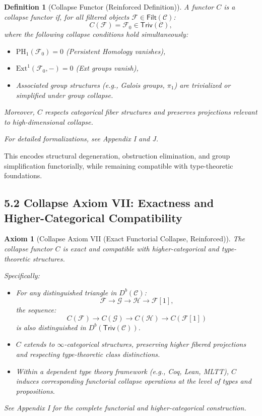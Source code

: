 \documentclass[11pt]{article}
\newtheorem{definition}[theorem]{Definition}
\newtheorem{axiom}{Axiom}[section]
\begin{document}
\begin{definition}[Collapse Functor (Reinforced Definition)]
A functor \( C \) is a collapse functor if, for all filtered objects \( \mathcal{F} \in \mathsf{Filt}(\mathcal{C}) \):
\[
C(\mathcal{F}) = \mathcal{F}_0 \in \mathsf{Triv}(\mathcal{C}),
\]
where the following collapse conditions hold simultaneously:
\begin{itemize}
    \item \(\mathrm{PH}_1(\mathcal{F}_0) = 0\) \quad (Persistent Homology vanishes),
    \item \(\mathrm{Ext}^1(\mathcal{F}_0, -) = 0\) \quad (Ext groups vanish),
    \item Associated group structures (e.g., Galois groups, \(\pi_1\)) are trivialized or simplified under group collapse.
\end{itemize}
Moreover, \( C \) respects categorical fiber structures and preserves projections relevant to high-dimensional collapse.

For detailed formalizations, see Appendix I and J.
\end{definition}

This encodes structural degeneration, obstruction elimination, and group simplification functorially, while remaining compatible with type-theoretic foundations.

\subsection*{5.2 Collapse Axiom VII: Exactness and Higher-Categorical Compatibility}

\begin{axiom}[Collapse Axiom VII (Exact Functorial Collapse, Reinforced)]
The collapse functor \( C \) is exact and compatible with higher-categorical and type-theoretic structures.

Specifically:
\begin{itemize}
    \item For any distinguished triangle in \( D^b(\mathcal{C}) \):
    \[
    \mathcal{F} \to \mathcal{G} \to \mathcal{H} \to \mathcal{F}[1],
    \]
    the sequence:
    \[
    C(\mathcal{F}) \to C(\mathcal{G}) \to C(\mathcal{H}) \to C(\mathcal{F}[1])
    \]
    is also distinguished in \( D^b(\mathsf{Triv}(\mathcal{C})) \).
    
    \item \( C \) extends to \(\infty\)-categorical structures, preserving higher fibered projections and respecting type-theoretic class distinctions.

    \item Within a dependent type theory framework (e.g., Coq, Lean, MLTT), \( C \) induces corresponding functorial collapse operations at the level of types and propositions.
\end{itemize}

See Appendix I for the complete functorial and higher-categorical construction.
\end{axiom}
\end{document}
